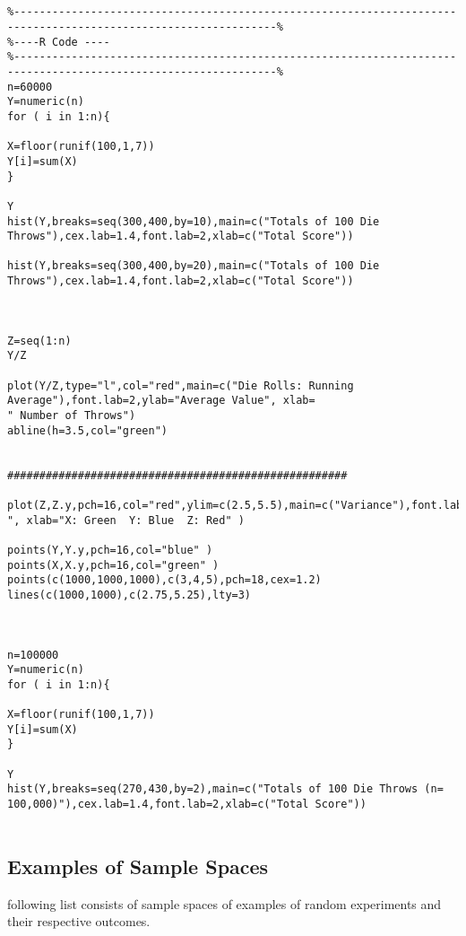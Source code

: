 \documentclass[]{report}
\begin{document}
{{{{\begin{itemize}
\end{itemize}












\begin{verbatim}


%---------------------------------------------------------------------------------------------------------------%
%----R Code ----
%---------------------------------------------------------------------------------------------------------------%
n=60000
Y=numeric(n)
for ( i in 1:n){

X=floor(runif(100,1,7))
Y[i]=sum(X)
}

Y
hist(Y,breaks=seq(300,400,by=10),main=c("Totals of 100 Die Throws"),cex.lab=1.4,font.lab=2,xlab=c("Total Score"))

hist(Y,breaks=seq(300,400,by=20),main=c("Totals of 100 Die Throws"),cex.lab=1.4,font.lab=2,xlab=c("Total Score"))



Z=seq(1:n)
Y/Z

plot(Y/Z,type="l",col="red",main=c("Die Rolls: Running Average"),font.lab=2,ylab="Average Value", xlab=
" Number of Throws")
abline(h=3.5,col="green")


#####################################################

plot(Z,Z.y,pch=16,col="red",ylim=c(2.5,5.5),main=c("Variance"),font.lab=2,ylab=" ", xlab="X: Green  Y: Blue  Z: Red" )

points(Y,Y.y,pch=16,col="blue" )
points(X,X.y,pch=16,col="green" )
points(c(1000,1000,1000),c(3,4,5),pch=18,cex=1.2)
lines(c(1000,1000),c(2.75,5.25),lty=3)



n=100000
Y=numeric(n)
for ( i in 1:n){

X=floor(runif(100,1,7))
Y[i]=sum(X)
}

Y
hist(Y,breaks=seq(270,430,by=2),main=c("Totals of 100 Die Throws (n= 100,000)"),cex.lab=1.4,font.lab=2,xlab=c("Total Score")) 


\end{verbatim}









\subsection{Examples of Sample Spaces}
\begin{itemize}
\itemThe following list consists of sample spaces of examples of random experiments and their respective outcomes.


\end{itemize}}}}}
\end{document}
